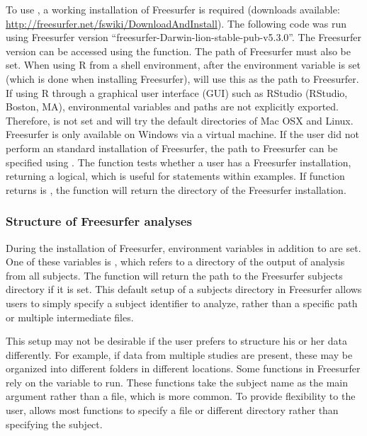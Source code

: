 To use , a working installation of Freesurfer is
required (downloads available:
\url{http://freesurfer.net/fswiki/DownloadAndInstall}). The following
code was run using Freesurfer version
``freesurfer-Darwin-lion-stable-pub-v5.3.0''. The Freesurfer version can
be accessed using the   function. The
path of Freesurfer must also be set. When using R from a shell
environment, after the  environment variable is
set (which is done when installing Freesurfer),  will
use this as the path to Freesurfer. If using R through a graphical user
interface (GUI) such as RStudio (RStudio, Boston, MA), environmental
variables and paths are not explicitly exported. Therefore,
 is not set and  will try the
default directories of Mac OSX and Linux. Freesurfer is only available
on Windows via a virtual machine. If the user did not perform an
standard installation of Freesurfer, the path to Freesurfer can be
specified using .
The  function tests whether a user has a Freesurfer
installation, returning a logical, which is useful for 
statements within examples. If  function returns is
, the  function will return the directory of
the Freesurfer installation.

\subsubsection{Structure of Freesurfer
analyses}\label{structure-of-freesurfer-analyses}

During the installation of Freesurfer, environment variables in addition
to  are set. One of these variables is
, which refers to a directory of the output of
analysis from all subjects. The  function will
return the path to the Freesurfer subjects directory if it is set. This
default setup of a subjects directory in Freesurfer allows users to
simply specify a subject identifier to analyze, rather than a specific
path or multiple intermediate files.

This setup may not be desirable if the user prefers to structure his or
her data differently. For example, if data from multiple studies are
present, these may be organized into different folders in different
locations. Some functions in Freesurfer rely on the 
variable to run. These functions take the subject name as the main
argument rather than a file, which is more common. To provide
flexibility to the user,  allows most functions to
specify a file or different directory rather than specifying the
subject.


